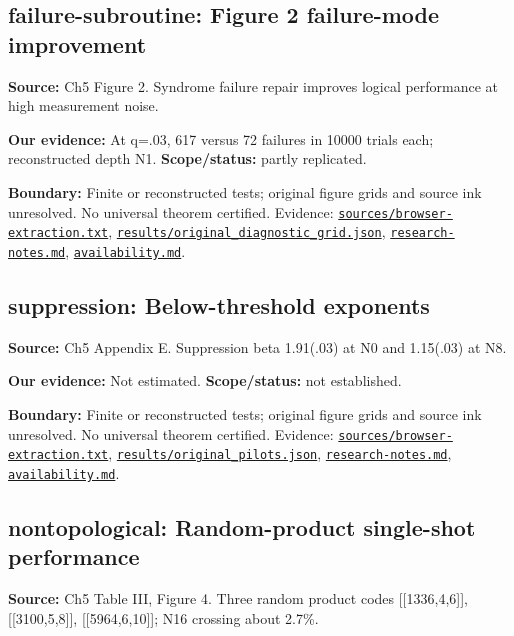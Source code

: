 \documentclass[11pt]{article}
\begin{document}
\subsection{failure-subroutine: Figure 2 failure-mode improvement}
\label{claim:failure-subroutine}
\textbf{Source:} Ch5 Figure 2. Syndrome failure repair improves logical performance at high measurement noise.

\textbf{Our evidence:} At q=.03, 617 versus 72 failures in 10000 trials each; reconstructed depth N1. \textbf{Scope/status:} partly replicated.

\textbf{Boundary:} Finite or reconstructed tests; original figure grids and source ink unresolved. No universal theorem certified. Evidence: \href{https://github.com/alectionary/vibe-math/blob/master/formalization/quintavalle-hgp/sources/browser-extraction.txt}{\nolinkurl{sources/browser-extraction.txt}}, \href{https://github.com/alectionary/vibe-math/blob/master/formalization/quintavalle-hgp/results/original_diagnostic_grid.json}{\nolinkurl{results/original_diagnostic_grid.json}}, \href{https://github.com/alectionary/vibe-math/blob/master/formalization/quintavalle-hgp/research-notes.md}{\nolinkurl{research-notes.md}}, \href{https://github.com/alectionary/vibe-math/blob/master/formalization/quintavalle-hgp/availability.md}{\nolinkurl{availability.md}}.
\subsection{suppression: Below-threshold exponents}
\label{claim:suppression}
\textbf{Source:} Ch5 Appendix E. Suppression beta 1.91(.03) at N0 and 1.15(.03) at N8.

\textbf{Our evidence:} Not estimated. \textbf{Scope/status:} not established.

\textbf{Boundary:} Finite or reconstructed tests; original figure grids and source ink unresolved. No universal theorem certified. Evidence: \href{https://github.com/alectionary/vibe-math/blob/master/formalization/quintavalle-hgp/sources/browser-extraction.txt}{\nolinkurl{sources/browser-extraction.txt}}, \href{https://github.com/alectionary/vibe-math/blob/master/formalization/quintavalle-hgp/results/original_pilots.json}{\nolinkurl{results/original_pilots.json}}, \href{https://github.com/alectionary/vibe-math/blob/master/formalization/quintavalle-hgp/research-notes.md}{\nolinkurl{research-notes.md}}, \href{https://github.com/alectionary/vibe-math/blob/master/formalization/quintavalle-hgp/availability.md}{\nolinkurl{availability.md}}.
\subsection{nontopological: Random-product single-shot performance}
\label{claim:nontopological}
\textbf{Source:} Ch5 Table III, Figure 4. Three random product codes [[1336,4,6]], [[3100,5,8]], [[5964,6,10]]; N16 crossing about 2.7\%.
\end{document}
